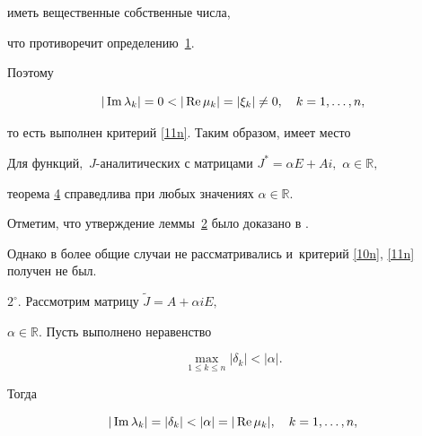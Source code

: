  иметь вещественные собственные числа,

что противоречит определению~\hyperlink{nik:def1}{1}. 

Поэтому

$$

|\mathop{\rm Im} \lambda_k|=0<|\mathop{\rm Re} \mu_k|=|\xi_k|\ne 0,\quad k=1, \ldots, n,

$$

то  есть  выполнен критерий \eqref{11n}.  Таким образом, имеет место



\smallskip



\hypertarget{nik:lemma2}{}



\begin{lemma}[2]Для функций$,$ $J$-аналитических с матрицами  $J^*=\alpha E+Ai,$ $\alpha\in\mathbb{R},$

      теорема {\rm \hyperlink{nik:th4}{4}} справедлива при любых   значениях $\alpha\in\mathbb{R}.$

\end{lemma}



\smallskip



Отметим, что утверждение леммы~\hyperlink{nik:lemma2}{2}  было доказано   в \cite{2Nk-Nk2}.

 Однако в \cite{2Nk-Nk2} более общие случаи не рассматривались  и~критерий \eqref{10n}, \eqref{11n} получен не был.



\smallskip



$2^\circ.$ Рассмотрим матрицу $\widetilde{J}=A+\alpha iE,$

$\alpha\in\mathbb{R}.$ Пусть выполнено неравенство

\begin{equation}

\max\limits_{1\le k \le n}|\delta_k|<|\alpha|.

\label{22n}

\end{equation}

Тогда

 $$

|\mathop{\rm Im}\lambda_k|=|\delta_k|<|\alpha|=

|\mathop{\rm Re}\mu_k|, \quad k=1,\ldots,n,

$$

